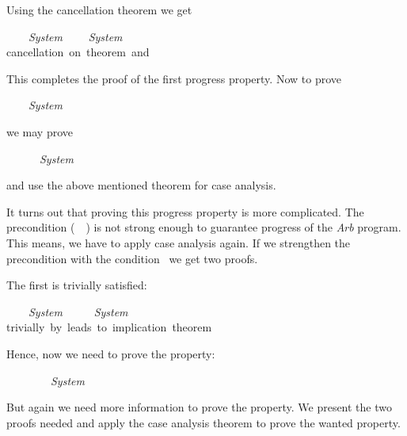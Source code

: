 Using the cancellation theorem we get
\begin{thm} 
 \rqb\;\mand\;\gra\ \leadto\ \grb\ \mmin\ {\it System}\nb[head23]
\p
 \rqb\;\mand\;\gra\ \leadto\ \grb\ \mmin\ {\it System}\nb[p231]\\
 \cnnn  \mbox{cancellation on theorem  and }
\end{thm}

This completes the proof of the first progress property.  Now to prove
  \begin{center}
     \rqb\ \leadto\ \grb\ \mmin\ {\it System}
  \end{center}
we may prove
  \begin{center}
     \rqb\ \mand\ \mnot\gra\ \leadto\ \grb\ \mmin\ {\it System}
  \end{center}
and use the above mentioned theorem for case analysis.

It turns out that proving this progress property is more complicated.  The 
precondition (\rqb~\mand~\mnot\gra) is not strong enough to guarantee progress 
of the {\it Arb} program.  This means, we have to apply case analysis again.
If we strengthen the precondition with the condition \grb\ we get two proofs.

The first is trivially satisfied:
\begin{thm}
 \rqb\;\mand\;\mnot\gra\;\mand\;\grb\ \leadto\ \grb\ \mmin\ {\it System}\nb[head24]
\p
 \rqb\;\mand\;\mnot\gra\ \grb\ \leadto\ \grb\ \mmin\ {\it System}\nb[p241]\\
 \cnnn  \mbox{trivially by leads to implication theorem}
\end{thm}

Hence, now we need to prove the property:
  \begin{center}
   \rqb\ \mand\ \mnot\gra\ \mand\ \mnot\grb\ \leadto\ \grb\ \mmin\ {\it System}
  \end{center}
But again we need more information to prove the property.  We present the
two proofs needed and apply the case analysis theorem to prove the wanted
property.

